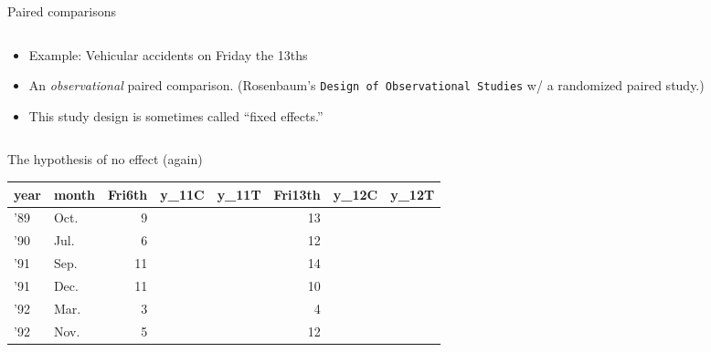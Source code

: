 \begin{frame}{Paired comparisons}
  
  \begin{columns}
    \begin{Column}
  \begin{itemize}
  \item Example: Vehicular accidents on Friday the
      13ths\footnotemark
  \item An \textit{observational} paired comparison.  (Rosenbaum's
    \texttt{Design of Observational Studies} w/
    a randomized paired study.)
  \item This study design is sometimes called ``fixed effects.''
  \end{itemize}      
    \end{Column}
    \begin{Column}
    \end{Column}
  \end{columns}
\end{frame}



\begin{frame}{The hypothesis of no effect (again)}

  \begin{center}
    \begin{tabular}{l|l|r|l|l|r|l|l}
\hline
year & month & Fri6th & y\_11C & y\_11T & Fri13th & y\_12C & y\_12T\\
\hline
'89 & Oct. & 9 &  &  & 13 &  & \\
\hline
'90 & Jul. & 6 &  &  & 12 &  & \\
\hline
'91 & Sep. & 11 &  &  & 14 &  & \\
\hline
'91 & Dec. & 11 &  &  & 10 &  & \\
\hline
'92 & Mar. & 3 &  &  & 4 &  & \\
\hline
'92 & Nov. & 5 &  &  & 12 &  & \\
\hline
\end{tabular}

  \end{center}

  
\end{frame}
